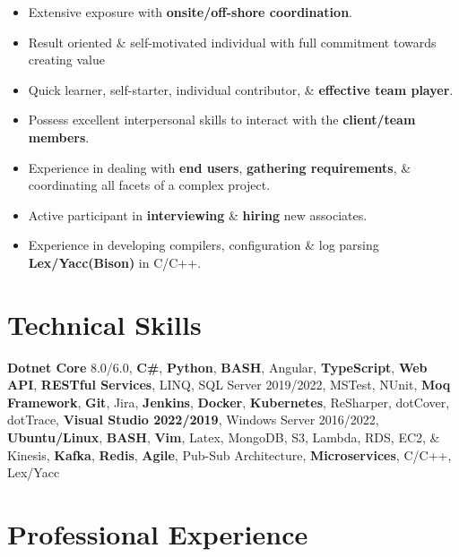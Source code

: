 \documentclass[letterpaper,9pt]{article}
\begin{document}
\begin{itemize}[itemsep=0.5em]
    \item Extensive exposure with \textbf{\color{black}onsite/off-shore coordination}.
    \item Result oriented \& self-motivated individual with full commitment towards creating value
    \item Quick learner, self-starter, individual contributor, \& \textbf{\color{black}effective team player}.
    \item Possess excellent interpersonal skills to interact with the \textbf{\color{black}client/team members}.
    \item Experience in dealing with \textbf{\color{black}end users}, \textbf{\color{black}gathering requirements}, \& coordinating all facets of a complex project.
    \item Active participant in \textbf{\color{black}interviewing} \& \textbf{\color{black}hiring} new associates.
    \item Experience in developing compilers, configuration \& log parsing \textbf{\color{black}Lex/Yacc(Bison)} in C/C++.
\end{itemize}

\section{Technical Skills}
\textbf{\color{black}Dotnet Core} 8.0/6.0, \textbf{\color{black}C\#}, \textbf{\color{black}Python}, \textbf{\color{black}BASH}, Angular, \textbf{\color{black}TypeScript}, \textbf{\color{black}Web API}, \textbf{\color{black}RESTful Services}, LINQ, SQL Server 2019/2022, MSTest, NUnit, \textbf{\color{black}Moq Framework}, \textbf{\color{black}Git}, Jira, \textbf{\color{black}Jenkins}, \textbf{\color{black}Docker}, \textbf{\color{black}Kubernetes}, ReSharper, dotCover, dotTrace, \textbf{\color{black}Visual Studio 2022/2019}, Windows Server 2016/2022, \textbf{\color{black}Ubuntu/Linux}, \textbf{\color{black}BASH}, \textbf{\color{black}Vim}, Latex, MongoDB, S3, Lambda, RDS, EC2, \& Kinesis, \textbf{\color{black}Kafka}, \textbf{\color{black}Redis}, \textbf{\color{black}Agile}, Pub-Sub Architecture, \textbf{\color{black}Microservices}, C/C++, Lex/Yacc

\pagebreak

\section{Professional Experience}

\end{document}
